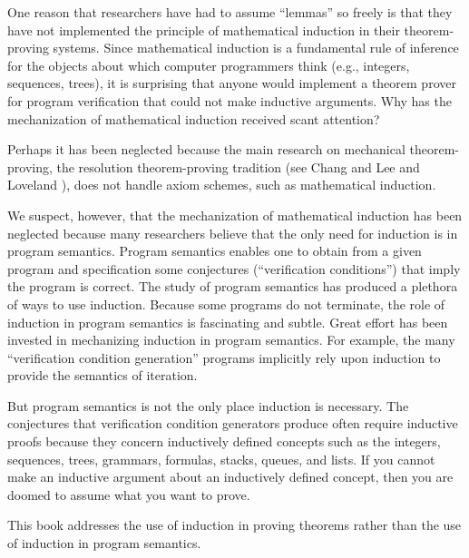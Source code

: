 \documentclass[11pt]{book}
\begin{document}
One reason that researchers have had to
assume ``lemmas'' so freely is that they
have not implemented the principle of mathematical induction
in their theorem-proving systems.  Since mathematical
induction is a fundamental rule of inference for the
objects about which computer programmers think  (e.g., integers, sequences, trees), it
is surprising  that anyone would  implement a theorem prover for program verification
that could not make inductive arguments.  Why has
the mechanization of mathematical induction received scant attention?

Perhaps it has been neglected because the main research
on mechanical theorem-proving, the resolution theorem-proving
tradition (see Chang and Lee \cite{CHANG} and Loveland \cite{LOVELAND}),
does not handle axiom schemes, such
as mathematical induction.

We suspect, however, that the mechanization of mathematical induction has
been neglected because many researchers believe that the only need for
induction is in program semantics.  Program
semantics enables one to obtain from a
given program and  specification some
conjectures (``verification conditions'') that imply the program is correct.
The study of program
semantics has produced a plethora of ways to use
induction.  Because some programs do not terminate,
the role of induction in program semantics is fascinating
and subtle.  Great effort has been invested in
mechanizing induction in program semantics.  For example, the 
many ``verification condition generation'' programs implicitly
rely upon induction to provide the semantics of iteration.

But program semantics is not the only place induction is necessary.
The conjectures that verification  condition generators produce  often
require inductive proofs because they concern inductively
defined concepts such as the integers, sequences, trees,
grammars, formulas, stacks, queues, and lists.
If you cannot make an
inductive argument about an inductively defined concept,
then you are doomed to assume
what you want to  prove.

This book addresses the use of induction in proving theorems
rather than the use of induction in program semantics.
\end{document}
